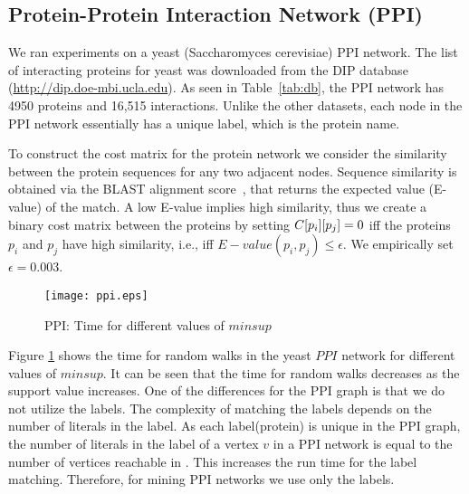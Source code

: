 \subsection{Protein-Protein Interaction Network (PPI)} We ran
experiments on a yeast (Saccharomyces cerevisiae) PPI network. The list of
interacting proteins for yeast was downloaded from the DIP database
(\url{http://dip.doe-mbi.ucla.edu}). As seen in Table~\ref{tab:db}, the
PPI network has 4950 proteins and 16,515 interactions.  Unlike the other
datasets, each node in the PPI network essentially has a unique label,
which is the protein name.  

\smallskip{} 
To construct the cost matrix for the protein network we consider the
similarity between the protein sequences for any two adjacent nodes.
Sequence similarity is obtained via the BLAST alignment
score~\cite{altschul90}, that returns the expected value (E-value) of
the match. A low E-value implies high similarity, thus we create a
binary cost matrix between the proteins by setting
${C}[p_i][p_j] =0$ iff the proteins $p_i$ and $p_j$ have high
similarity, i.e., iff $E-value(p_i, p_j) \le \epsilon$. We empirically 
set $\epsilon = 0.003$.


\begin{figure}[!h]
	\centerline{
	\texttt{[image: ppi.eps]}
	}
    \caption{PPI: Time for different values of $minsup$}
    \label{fig:ppiwalks}
\end{figure}

\smallskip{} Figure \ref{fig:ppiwalks} shows
the time for random walks in the yeast $PPI$ network for different values of
$minsup$.  It can be seen that the time for random walks decreases as
the support value increases.  One of the differences for the PPI graph
is that we do not utilize the \khop labels.  The complexity of matching
the \khop labels depends on the number of literals in the \khop label.
As each label(protein) is unique in the PPI graph, the number of
literals in the \khop label of a vertex $v$ in a PPI network is equal to
the number of vertices reachable in \khops. This increases the run time
for the \khop label matching.  Therefore, for mining PPI networks we use
only the \ncl labels.


